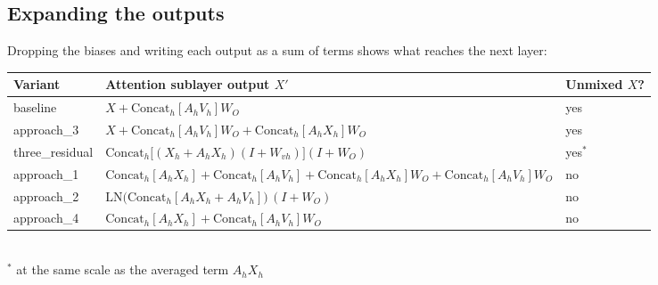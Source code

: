 \documentclass[11pt]{article}
\newcommand{\cat}{\mathrm{Concat}_h}
\newcommand{\aone}{approach\_1}
\newcommand{\atwo}{approach\_2}
\newcommand{\afour}{approach\_4}
\newcommand{\tr}{three\_residual}
\begin{document}
\subsection{Expanding the outputs}
Dropping the biases and writing each output as a sum of terms shows what reaches the next layer:
\begin{center}\footnotesize
\renewcommand{\arraystretch}{1.25}
\begin{tabular}{lll}
\toprule
Variant & Attention sublayer output $X'$ & Unmixed $X$? \\
\midrule
baseline & $X + \cat[A_hV_h]W_O$ & yes \\
approach\_3 & $X + \cat[A_hV_h]W_O + \cat[A_hX_h]W_O$ & yes \\
\tr{} & $\cat\big[(X_h + A_hX_h)(I + W_{vh})\big](I + W_O)$ & yes$^{*}$ \\
\midrule
\aone{} & $\cat[A_hX_h] + \cat[A_hV_h] + \cat[A_hX_h]W_O + \cat[A_hV_h]W_O$ & no \\
\atwo{} & $\mathrm{LN}\big(\cat[A_hX_h + A_hV_h]\big)\,(I + W_O)$ & no \\
\afour{} & $\cat[A_hX_h] + \cat[A_hV_h]W_O$ & no \\
\bottomrule
\end{tabular}\\[2pt]
{\scriptsize $^{*}$ at the same scale as the averaged term $A_hX_h$}
\end{center}
\end{document}
